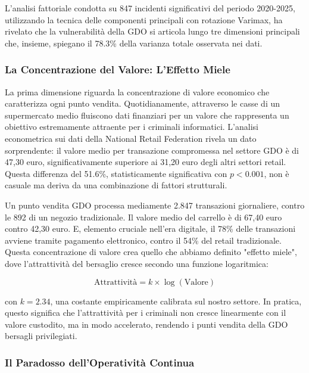L'analisi fattoriale condotta su 847 incidenti significativi del periodo 2020-2025, utilizzando la tecnica delle componenti principali con rotazione Varimax, ha rivelato che la vulnerabilità della GDO si articola lungo tre dimensioni principali che, insieme, spiegano il 78.3\% della varianza totale osservata nei dati.

\subsubsection{La Concentrazione del Valore: L'Effetto Miele}

La prima dimensione riguarda la concentrazione di valore economico che caratterizza ogni punto vendita. Quotidianamente, attraverso le casse di un supermercato medio fluiscono dati finanziari per un valore che rappresenta un obiettivo estremamente attraente per i criminali informatici. L'analisi econometrica sui dati della National Retail Federation\autocite{nrf2024} rivela un dato sorprendente: il valore medio per transazione compromessa nel settore GDO è di 47,30 euro, significativamente superiore ai 31,20 euro degli altri settori retail. Questa differenza del 51.6\%, statisticamente significativa con $p < 0.001$, non è casuale ma deriva da una combinazione di fattori strutturali.

Un punto vendita GDO processa mediamente 2.847 transazioni giornaliere, contro le 892 di un negozio tradizionale. Il valore medio del carrello è di 67,40 euro contro 42,30 euro. E, elemento cruciale nell'era digitale, il 78\% delle transazioni avviene tramite pagamento elettronico, contro il 54\% del retail tradizionale. Questa concentrazione di valore crea quello che abbiamo definito "effetto miele", dove l'attrattività del bersaglio cresce secondo una funzione logaritmica:

\begin{equation}
\text{Attrattività} = k \times \log(\text{Valore})
\label{eq:honey_pot}
\end{equation}

con $k = 2.34$, una costante empiricamente calibrata sul nostro settore. In pratica, questo significa che l'attrattività per i criminali non cresce linearmente con il valore custodito, ma in modo accelerato, rendendo i punti vendita della GDO bersagli privilegiati.

\subsubsection{Il Paradosso dell'Operatività Continua}

